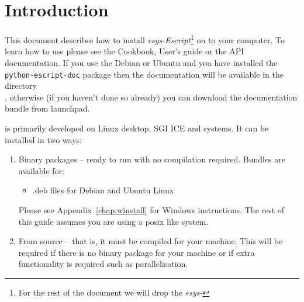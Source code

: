 %
%
%

\chapter{Introduction}
This document describes how to install \emph{esys-Escript}\footnote{For the rest of the document we will drop the \emph{esys-}} on to your computer.
To learn how to use \esfinley please see the Cookbook, User's guide or the API documentation.
If you use the Debian or Ubuntu and you have installed the \texttt{python-escript-doc} package then the documentation 
will be available in the directory\\
, otherwise (if you haven't done so already) you can download the documentation bundle 
from launchpad.



\esfinley is primarily developed on Linux desktop, SGI ICE and \macosx systems.
It can be installed in two ways:
\begin{enumerate}
  \item Binary packages -- ready to run with no compilation required.
      Bundles are available for:
      \begin{itemize}
	  \item .deb files for Debian and Ubuntu Linux
      \end{itemize}
    Please see Appendix~\ref{chap:winstall} for Windows instructions.
    The rest of this guide assumes you are using a posix like system.
  \item From source -- that is, it must be compiled for your machine.
  This will be required if there is no binary package 
    for your machine or if extra functionality is required such as \mpi parallelisation.
\end{enumerate}

